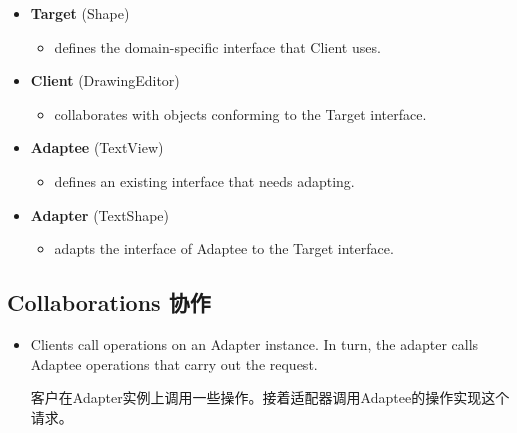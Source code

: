 \begin{itemize}

\item \textbf{Target} (Shape)

	\begin{itemize}
		\item defines the domain-specific interface that Client uses.
	\end{itemize}

\item \textbf{Client} (DrawingEditor)

	\begin{itemize}
		\item collaborates with objects conforming to the Target interface.
	\end{itemize}

\item \textbf{Adaptee} (TextView)

	\begin{itemize}
		\item defines an existing interface that needs adapting.
	\end{itemize}

\item \textbf{Adapter} (TextShape)

	\begin{itemize}
		\item adapts the interface of Adaptee to the Target interface.
	\end{itemize}

\end{itemize}

\subsection{Collaborations 协作}

\begin{itemize}
	\item Clients call operations on an Adapter instance. In turn, the adapter calls Adaptee operations that carry out the request.

	客户在Adapter实例上调用一些操作。接着适配器调用Adaptee的操作实现这个请求。
\end{itemize}

